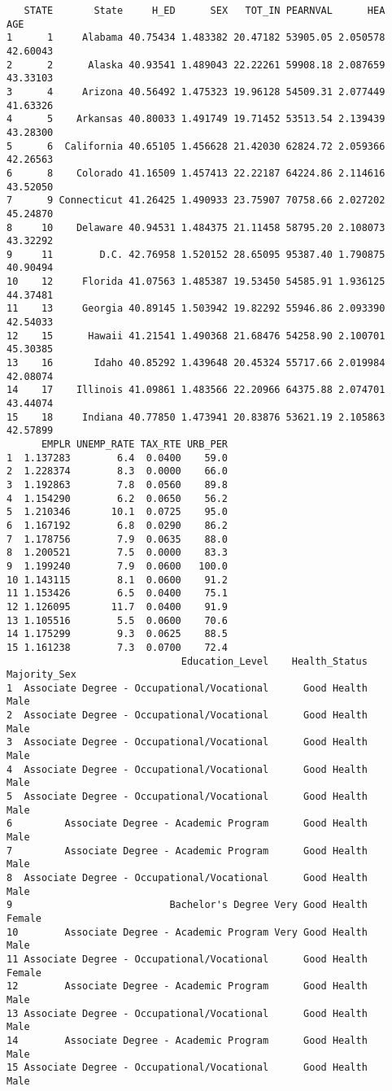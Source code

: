 \documentclass[
  12pt,
]{article}
\begin{document}
\begin{verbatim}
   STATE       State     H_ED      SEX   TOT_IN PEARNVAL      HEA      AGE
1      1     Alabama 40.75434 1.483382 20.47182 53905.05 2.050578 42.60043
2      2      Alaska 40.93541 1.489043 22.22261 59908.18 2.087659 43.33103
3      4     Arizona 40.56492 1.475323 19.96128 54509.31 2.077449 41.63326
4      5    Arkansas 40.80033 1.491749 19.71452 53513.54 2.139439 43.28300
5      6  California 40.65105 1.456628 21.42030 62824.72 2.059366 42.26563
6      8    Colorado 41.16509 1.457413 22.22187 64224.86 2.114616 43.52050
7      9 Connecticut 41.26425 1.490933 23.75907 70758.66 2.027202 45.24870
8     10    Delaware 40.94531 1.484375 21.11458 58795.20 2.108073 43.32292
9     11        D.C. 42.76958 1.520152 28.65095 95387.40 1.790875 40.90494
10    12     Florida 41.07563 1.485387 19.53450 54585.91 1.936125 44.37481
11    13     Georgia 40.89145 1.503942 19.82292 55946.86 2.093390 42.54033
12    15      Hawaii 41.21541 1.490368 21.68476 54258.90 2.100701 45.30385
13    16       Idaho 40.85292 1.439648 20.45324 55717.66 2.019984 42.08074
14    17    Illinois 41.09861 1.483566 22.20966 64375.88 2.074701 43.44074
15    18     Indiana 40.77850 1.473941 20.83876 53621.19 2.105863 42.57899
      EMPLR UNEMP_RATE TAX_RTE URB_PER
1  1.137283        6.4  0.0400    59.0
2  1.228374        8.3  0.0000    66.0
3  1.192863        7.8  0.0560    89.8
4  1.154290        6.2  0.0650    56.2
5  1.210346       10.1  0.0725    95.0
6  1.167192        6.8  0.0290    86.2
7  1.178756        7.9  0.0635    88.0
8  1.200521        7.5  0.0000    83.3
9  1.199240        7.9  0.0600   100.0
10 1.143115        8.1  0.0600    91.2
11 1.153426        6.5  0.0400    75.1
12 1.126095       11.7  0.0400    91.9
13 1.105516        5.5  0.0600    70.6
14 1.175299        9.3  0.0625    88.5
15 1.161238        7.3  0.0700    72.4
                              Education_Level    Health_Status Majority_Sex
1  Associate Degree - Occupational/Vocational      Good Health         Male
2  Associate Degree - Occupational/Vocational      Good Health         Male
3  Associate Degree - Occupational/Vocational      Good Health         Male
4  Associate Degree - Occupational/Vocational      Good Health         Male
5  Associate Degree - Occupational/Vocational      Good Health         Male
6         Associate Degree - Academic Program      Good Health         Male
7         Associate Degree - Academic Program      Good Health         Male
8  Associate Degree - Occupational/Vocational      Good Health         Male
9                           Bachelor's Degree Very Good Health       Female
10        Associate Degree - Academic Program Very Good Health         Male
11 Associate Degree - Occupational/Vocational      Good Health       Female
12        Associate Degree - Academic Program      Good Health         Male
13 Associate Degree - Occupational/Vocational      Good Health         Male
14        Associate Degree - Academic Program      Good Health         Male
15 Associate Degree - Occupational/Vocational      Good Health         Male
\end{verbatim}
\end{document}
